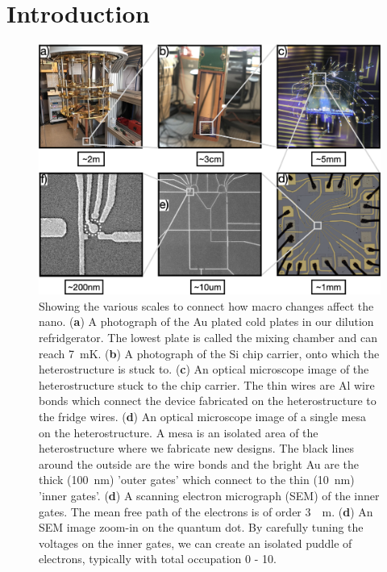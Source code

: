 \chapter{Introduction}\label{cha:intro}


\begin{figure}[!htb]
  \begin{center}
    \includegraphics[width=1.0\textwidth]{figures/ch1/crop_FiguresMaster.001.png}
    \caption[Dilution fridge to quantum dot scale breakdown]{\label{fig:ch1/scale_breakdown} 
    Showing the various scales to connect how macro changes affect the nano. (\textbf{a}) A photograph of the Au plated cold plates in our dilution refridgerator. The lowest plate is called the mixing chamber and can reach \qty{7}{mK}. (\textbf{b}) A photograph of the Si chip carrier, onto which the heterostructure is stuck to. (\textbf{c}) An optical microscope image of the heterostructure stuck to the chip carrier. The thin wires are Al wire bonds which connect the device fabricated on the heterostructure to the fridge wires. (\textbf{d}) An optical microscope image of a single mesa on the heterostructure. A mesa is an isolated area of the heterostructure where we fabricate new designs. The black lines around the outside are the wire bonds and the bright Au are the thick (\qty{100}{nm}) 'outer gates' which connect to the thin (\qty{10}{nm}) 'inner gates'. (\textbf{d}) A scanning electron micrograph (SEM) of the inner gates. The mean free path of the electrons is of order \qty{3}{\mu m}.  (\textbf{d}) An SEM image zoom-in on the quantum dot. By carefully tuning the voltages on the inner gates, we can create an isolated puddle of electrons, typically with total occupation 0 - 10.  
      }
  \end{center}
\end{figure}